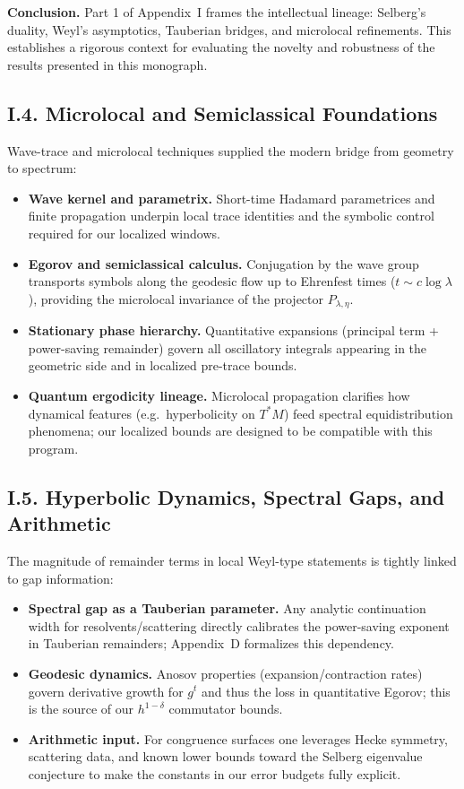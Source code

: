 \bigskip
\noindent\textbf{Conclusion.}  
Part 1 of Appendix~I frames the intellectual lineage: Selberg’s duality, Weyl’s asymptotics, Tauberian bridges, and microlocal refinements. This establishes a rigorous context for evaluating the novelty and robustness of the results presented in this monograph.  


\subsection*{I.4. Microlocal and Semiclassical Foundations}
\noindent
Wave-trace and microlocal techniques supplied the modern bridge from geometry to spectrum:
\begin{itemize}
  \item \textbf{Wave kernel and parametrix.} Short-time Hadamard parametrices and finite propagation underpin local trace identities and the symbolic control required for our localized windows.
  \item \textbf{Egorov and semiclassical calculus.} Conjugation by the wave group transports symbols along the geodesic flow up to Ehrenfest times (\(t\sim c\log\lambda\)), providing the microlocal invariance of the projector \(P_{\lambda,\eta}\).
  \item \textbf{Stationary phase hierarchy.} Quantitative expansions (principal term + power-saving remainder) govern all oscillatory integrals appearing in the geometric side and in localized pre-trace bounds.
  \item \textbf{Quantum ergodicity lineage.} Microlocal propagation clarifies how dynamical features (e.g.\ hyperbolicity on \(T^*M\)) feed spectral equidistribution phenomena; our localized bounds are designed to be compatible with this program.
\end{itemize}

\subsection*{I.5. Hyperbolic Dynamics, Spectral Gaps, and Arithmetic}
\noindent
The magnitude of remainder terms in local Weyl-type statements is tightly linked to gap information:
\begin{itemize}
  \item \textbf{Spectral gap as a Tauberian parameter.} Any analytic continuation width for resolvents/scattering directly calibrates the power-saving exponent in Tauberian remainders; Appendix~D formalizes this dependency.
  \item \textbf{Geodesic dynamics.} Anosov properties (expansion/contraction rates) govern derivative growth for \(g^t\) and thus the loss in quantitative Egorov; this is the source of our \(h^{1-\delta}\) commutator bounds.
  \item \textbf{Arithmetic input.} For congruence surfaces one leverages Hecke symmetry, scattering data, and known lower bounds toward the Selberg eigenvalue conjecture to make the constants in our error budgets fully explicit.
\end{itemize}

